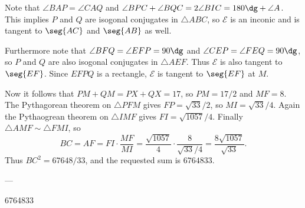 Note that $\angle BAP=\angle CAQ$ and $\angle BPC+\angle BQC=2\angle BIC=180\dg+\angle A$. This implies $P$ and $Q$ are isogonal conjugates in $\triangle ABC$, so $\mathcal E$ is an inconic and is tangent to $\seg{AC}$ and $\seg{AB}$ as well.

Furthermore note that $\angle BFQ=\angle EFP=90\dg$ and $\angle CEP=\angle FEQ=90\dg$, so $P$ and $Q$ are also isogonal conjugates in $\triangle AEF$. Thus $\mathcal E$ is also tangent to $\seg{EF}$. Since $EFPQ$ is a rectangle, $\mathcal E$ is tangent to $\seg{EF}$ at $M$.

Now it follows that $PM+QM=PX+QX=17$, so $PM=17/2$ and $MF=8$. The Pythagorean theorem on $\triangle PFM$ gives $FP=\sqrt{33}/2$, so $MI=\sqrt{33}/4$. Again the Pythaogrean theorem on $\triangle IMF$ gives $FI=\sqrt{1057}/4$. Finally $\triangle AMF\sim\triangle FMI$, so \[BC=AF=FI\cdot\frac{MF}{MI}=\frac{\sqrt{1057}}4\cdot\frac8{\sqrt{33}/4}=\frac{8\sqrt{1057}}{\sqrt{33}}.\]
Thus $BC^2=67648/33$, and the requested sum is $6764833$.

---

6764833
